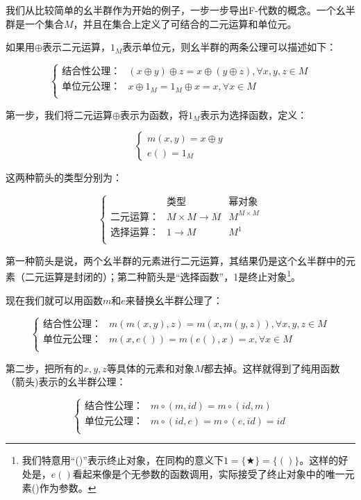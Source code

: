 \documentclass[b5paper]{ctexart}
\begin{document}
\begin{example}
我们从比较简单的幺半群作为开始的例子，一步一步导出F-代数的概念。一个幺半群是一个集合$M$，并且在集合上定义了可结合的二元运算和单位元。

如果用$\oplus$表示二元运算，$1_M$表示单位元，则幺半群的两条公理可以描述如下：

\[
\begin{cases}
\text{结合性公理：} & (x \oplus y) \oplus z = x \oplus (y \oplus z), \forall x, y, z \in M \\
\text{单位元公理：} & x \oplus 1_M = 1_M \oplus x = x, \forall x \in M \\
\end{cases}
\]

第一步，我们将二元运算$\oplus$表示为函数，将$1_M$表示为选择函数，定义：

\[
\begin{cases}
m (x, y) = x \oplus y \\
e () = 1_M
\end{cases}
\]

这两种箭头的类型分别为：

\[
\left \{
\begin{array}{lll}
 & \text{类型} & \text{幂对象} \\
\text{二元运算：} & M \times M \to M & M^{M \times M}\\
\text{选择运算：} & 1 \to M & M^1 \\
\end{array}
\right .
\]

第一种箭头是说，两个幺半群的元素进行二元运算，其结果仍是这个幺半群中的元素（二元运算是封闭的）；第二种箭头是“选择函数”，1是终止对象\footnote{我们特意用“()”表示终止对象，在同构的意义下$1 = \{ \bigstar \} = \{ () \}$。这样的好处是，$e()$看起来像是个无参数的函数调用，实际接受了终止对象中的唯一元素()作为参数。}。

现在我们就可以用函数$m$和$e$来替换幺半群公理了：

\[
\begin{cases}
\text{结合性公理：} & m(m(x, y), z) = m(x, m(y, z)), \forall x, y, z \in M \\
\text{单位元公理：} & m(x, e()) = m(e(), x) = x, \forall x \in M \\
\end{cases}
\]

第二步，把所有的$x, y, z$等具体的元素和对象$M$都去掉。这样就得到了纯用函数（箭头)表示的幺半群公理：

\[
\begin{cases}
\text{结合性公理：} & m \circ (m, id) = m \circ (id, m) \\
\text{单位元公理：} & m \circ (id, e) = m \circ (e, id) = id \\
\end{cases}
\]


\end{example}
\end{document}

